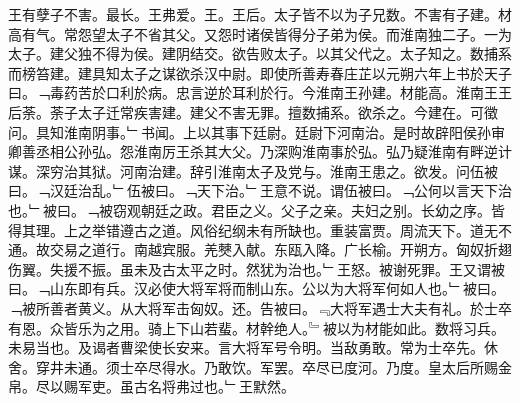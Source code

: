 \documentclass{zhvt-classic}
\begin{document}
\hspace*{2em}王有孽子不害。最长。王弗爱。王。王后。太子皆不以为子兄数。不害有子建。材高有气。常怨望太子不省其父。又怨时诸侯皆得分子弟为侯。而淮南独二子。一为太子。建父独不得为侯。建阴结交。欲告败太子。以其父代之。太子知之。数捕系而榜笞建。建具知太子之谋欲杀汉中尉。即使所善寿春庄芷以元朔六年上书於天子曰。﹁毒药苦於口利於病。忠言逆於耳利於行。今淮南王孙建。材能高。淮南王王后荼。荼子太子迁常疾害建。建父不害无罪。擅数捕系。欲杀之。今建在。可徵问。具知淮南阴事。﹂书闻。上以其事下廷尉。廷尉下河南治。是时故辟阳侯孙审卿善丞相公孙弘。怨淮南厉王杀其大父。乃深购淮南事於弘。弘乃疑淮南有畔逆计谋。深穷治其狱。河南治建。辞引淮南太子及党与。淮南王患之。欲发。问伍被曰。﹁汉廷治乱。﹂伍被曰。﹁天下治。﹂王意不说。谓伍被曰。﹁公何以言天下治也。﹂被曰。﹁被窃观朝廷之政。君臣之义。父子之亲。夫妇之别。长幼之序。皆得其理。上之举错遵古之道。风俗纪纲未有所缺也。重装富贾。周流天下。道无不通。故交易之道行。南越宾服。羌僰入献。东瓯入降。广长榆。开朔方。匈奴折翅伤翼。失援不振。虽未及古太平之时。然犹为治也。﹂王怒。被谢死罪。王又谓被曰。﹁山东即有兵。汉必使大将军将而制山东。公以为大将军何如人也。﹂被曰。﹁被所善者黄义。从大将军击匈奴。还。告被曰。﹃大将军遇士大夫有礼。於士卒有恩。众皆乐为之用。骑上下山若蜚。材幹绝人。﹄被以为材能如此。数将习兵。未易当也。及谒者曹梁使长安来。言大将军号令明。当敌勇敢。常为士卒先。休舍。穿井未通。须士卒尽得水。乃敢饮。军罢。卒尽已度河。乃度。皇太后所赐金帛。尽以赐军吏。虽古名将弗过也。﹂王默然。\\
\end{document}
